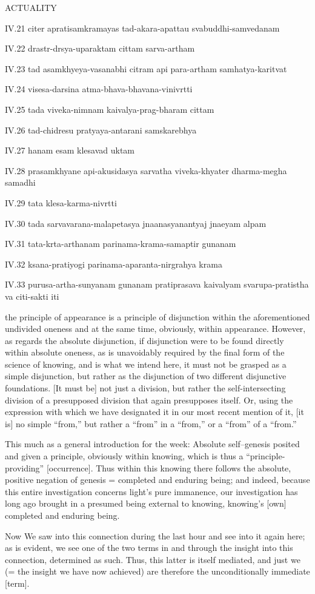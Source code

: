 ACTUALITY

IV.21
citer apratisamkramayas tad-akara-apattau svabuddhi-samvedanam

IV.22
drastr-drsya-uparaktam cittam sarva-artham

IV.23
tad asamkhyeya-vasanabhi citram api para-artham samhatya-karitvat

IV.24
visesa-darsina atma-bhava-bhavana-vinivrtti

IV.25
tada viveka-nimnam kaivalya-prag-bharam cittam

IV.26
tad-chidresu pratyaya-antarani samskarebhya

IV.27
hanam esam klesavad uktam

IV.28
prasamkhyane api-akusidasya sarvatha viveka-khyater dharma-megha samadhi

IV.29
tata klesa-karma-nivrtti

IV.30
tada sarvavarana-malapetasya jnaanasyanantyaj jnaeyam alpam

IV.31
tata-krta-arthanam parinama-krama-samaptir gunanam

IV.32
ksana-pratiyogi parinama-aparanta-nirgrahya krama

IV.33
purusa-artha-sunyanam gunanam pratiprasava kaivalyam
svarupa-pratistha va citi-sakti iti

the principle of appearance is
a principle of disjunction
within the aforementioned undivided oneness
and at the same time, obviously, within appearance.
However, as regards the absolute disjunction,
if disjunction were to be found
directly within absolute oneness,
as is unavoidably required by
the final form of the science of knowing,
and is what we intend here,
it must not be grasped as a simple disjunction,
but rather as the disjunction of
two different disjunctive foundations.
[It must be] not just a division,
but rather the self-intersecting division
of a presupposed division that again presupposes itself.
Or, using the expression with which we have designated it
in our most recent mention of it,
[it is] no simple “from,”
but rather a “from” in a “from,”
or a “from” of a “from.”

This much as a general introduction for the week:
Absolute self–genesis posited
and given a principle,
obviously within knowing,
which is thus a “principle-providing” [occurrence].
Thus within this knowing there follows
the absolute, positive negation of genesis =
completed and enduring being;
and indeed, because this entire investigation
concerns light’s pure immanence,
our investigation has long ago brought in
a presumed being external to knowing,
knowing’s [own] completed and enduring being.

Now We saw into this connection during the last hour
and see into it again here;
as is evident, we see one of the two terms
in and through the insight into this connection,
determined as such.
Thus, this latter is itself mediated,
and just we (= the insight we have now achieved) are
therefore the unconditionally immediate [term].
